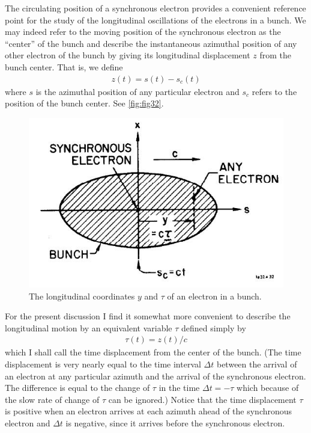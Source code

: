 The circulating position of a synchronous electron provides a convenient reference point for the study of the longitudinal oscillations of the electrons in a bunch. We may indeed refer to the moving position of the synchronous electron as the “center” of the bunch and describe the instantaneous azimuthal position of any other electron of the bunch by giving its longitudinal displacement $z$ from the bunch center. That is, we define
\begin{align}
	z(t) = s(t) - s_c(t)
\end{align}
where $s$ is the azimuthal position of any particular electron and $s_c$ refers to the position of the bunch center. See \autoref{fig:fig32}.

\begin{figure}[!htb]
	\centering
	\includegraphics[width=0.6\linewidth]{./Figuras/fig32.jpeg}
	\caption{The longitudinal coordinates $y$ and $\tau$ of an electron in a bunch.}
	\label{fig:fig32}
\end{figure}

For the present discussion I find it somewhat more convenient to describe the longitudinal motion by an equivalent variable $\tau$ defined simply by
\begin{align}
	\tau(t) = z(t)/c
\end{align}
which I shall call the time displacement from the center of the bunch. (The time displacement is very nearly equal to the time interval $\Delta t$ between the arrival of an electron at any particular azimuth and the arrival of the synchronous electron. The difference is equal to the change of $\tau$ in the time $\Delta t = - \tau$ which because of the slow rate of change of $\tau$ can be ignored.) Notice that the time displacement $\tau$ is positive when an electron arrives at each azimuth ahead of the synchronous electron and $\Delta t$ is negative, since it arrives before the synchronous electron.

